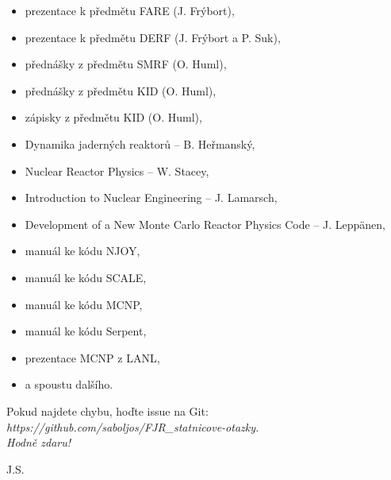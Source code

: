 \documentclass[a4paper, 11pt]{article}
\begin{document}
\begin{itemize}
    \item prezentace k předmětu FARE (J. Frýbort),
    \item prezentace k předmětu DERF (J. Frýbort a P. Suk),
    \item přednášky z předmětu SMRF (O. Huml),
    \item přednášky z předmětu KID (O. Huml),
    \item zápisky z předmětu KID (O. Huml),
    \item Dynamika jaderných reaktorů -- B. Heřmanský,
    \item Nuclear Reactor Physics -- W. Stacey,
    \item Introduction to Nuclear Engineering -- J. Lamarsch,
    \item Development of a New Monte Carlo Reactor Physics Code -- J. Leppänen,
    \item manuál ke kódu NJOY,
    \item manuál ke kódu SCALE,
    \item manuál ke kódu MCNP,
    \item manuál ke kódu Serpent,
    \item prezentace MCNP z LANL,
    \item a spoustu dalšího.
\end{itemize}

Pokud najdete chybu, hoďte issue na Git: \it{https://github.com/saboljos/FJR\_statnicove-otazky}.\\

\rm Hodně zdaru!

\rm J.S.

\vspace{2em}

\clearpage{\pagestyle{empty}}



\newpage
\parskip=0pt
\begin{small}
\tableofcontents
\end{small}
\parskip=7pt
\newpage
















% 
% 
% 
% 
% 
% 
% 
% 
% 
\end{document}
